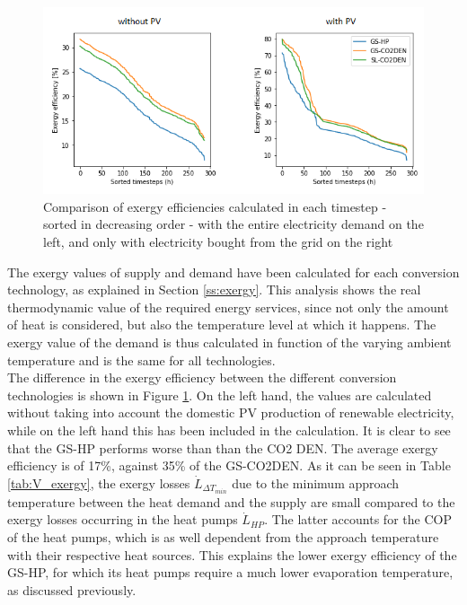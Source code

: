 \documentclass{article}
\begin{document}


\begin{figure}[tph]
	\centering
	\includegraphics[width=0.875\linewidth]{Images/V_EXE}
	\caption{Comparison of exergy efficiencies calculated in each timestep - sorted in decreasing order - with the entire electricity demand on the left, and only with electricity bought from the grid on the right}
	\label{fig:v_exe}
\end{figure}

The exergy values of supply and demand have been calculated for each conversion technology, as explained in Section \ref{ss:exergy}. This analysis shows the real thermodynamic value of the required energy services, since not only the amount of heat is considered, but also the temperature level at which it happens. The exergy value of the demand is thus calculated in function of the varying ambient temperature and is the same for all technologies.\\

The difference in the exergy efficiency between the different conversion technologies is shown in Figure \ref{fig:v_exe}. On the left hand, the values are calculated without taking into account the domestic PV production of renewable electricity, while on the left hand this has been included in the calculation. It is clear to see that the GS-HP performs worse than than the CO2 DEN. The average exergy efficiency is of 17\%, against 35\% of the GS-CO2DEN. As it can be seen in Table \ref{tab:V_exergy}, the exergy losses $\dot{L}_{\Delta T_{min}}$ due to the minimum approach temperature between the heat demand and the supply are small compared to the exergy losses occurring in the heat pumps $\dot{L}_{HP}$. The latter accounts for the COP of the heat pumps, which is as well dependent from the approach temperature with their respective heat sources. This explains the lower exergy efficiency of the GS-HP, for which its heat pumps require a much lower evaporation temperature, as discussed previously.\\
\end{document}
